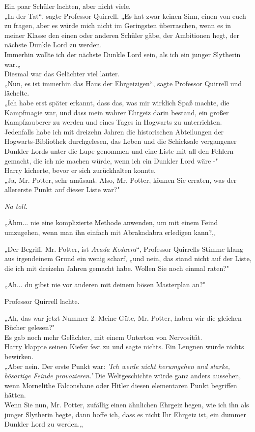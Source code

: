 {Ein paar Schüler lachten, aber nicht viele.\\ „In der Tat“, sagte Professor Quirrell. „Es hat zwar keinen Sinn, einen von euch zu fragen, aber es würde mich nicht im Geringsten überraschen, wenn es in meiner Klasse den einen oder anderen Schüler gäbe, der Ambitionen hegt, der nächste Dunkle Lord zu werden.\\ Immerhin wollte ich der nächste Dunkle Lord sein, als ich ein junger Slytherin war.„\\ Diesmal war das Gelächter viel lauter.\\ „Nun, es ist immerhin das Haus der Ehrgeizigen“, sagte Professor Quirrell und lächelte.\\ „Ich habe erst später erkannt, dass das, was mir wirklich Spaß machte, die Kampfmagie war, und dass mein wahrer Ehrgeiz darin bestand, ein großer Kampfzauberer zu werden und eines Tages in Hogwarts zu unterrichten.\\ Jedenfalls habe ich mit dreizehn Jahren die historischen Abteilungen der Hogwarts-Bibliothek durchgelesen, das Leben und die Schicksale vergangener Dunkler Lords unter die Lupe genommen und eine Liste mit all den Fehlern gemacht, die ich nie machen würde, wenn ich ein Dunkler Lord wäre -"\\ Harry kicherte, bevor er sich zurückhalten konnte.\\ „Ja, Mr. Potter, sehr amüsant. Also, Mr. Potter, können Sie erraten, was der allererste Punkt auf dieser Liste war?"

\emph{Na toll.}

„Ähm... nie eine komplizierte Methode anwenden, um mit einem Feind umzugehen, wenn man ihn einfach mit Abrakadabra erledigen kann?„

„Der Begriff, Mr. Potter, ist \emph{Avada Kedavra}“, Professor Quirrells Stimme klang aus irgendeinem Grund ein wenig scharf, „und nein, das stand nicht auf der Liste, die ich mit dreizehn Jahren gemacht habe. Wollen Sie noch einmal raten?"

„Ah... du gibst nie vor anderen mit deinem bösen Masterplan an?"

Professor Quirrell lachte.

„Ah, das war jetzt Nummer 2. Meine Güte, Mr. Potter, haben wir die gleichen Bücher gelesen?"\\ Es gab noch mehr Gelächter, mit einem Unterton von Nervosität.\\ Harry klappte seinen Kiefer fest zu und sagte nichts. Ein Leugnen würde nichts bewirken.\\ „Aber nein. Der erste Punkt war: \emph{'Ich werde nicht herumgehen und starke, bösartige Feinde provozieren.'} Die Weltgeschichte würde ganz anders aussehen, wenn Mornelithe Falconsbane oder Hitler diesen elementaren Punkt begriffen hätten.\\ Wenn Sie nun, Mr. Potter, zufällig einen ähnlichen Ehrgeiz hegen, wie ich ihn als junger Slytherin hegte, dann hoffe ich, dass es nicht Ihr Ehrgeiz ist, ein dummer Dunkler Lord zu werden.„

}
